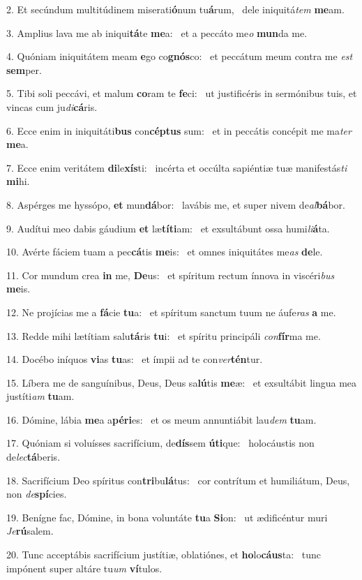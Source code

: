 2. Et secúndum multitúdinem miserati\textbf{ó}num tu\textbf{á}rum, \ast\  dele iniquitá\textit{tem} \textbf{me}am.\

3. Amplius lava me ab iniqui\textbf{tá}te \textbf{me}a: \ast\  et a peccáto me\textit{o} \textbf{mun}da me.\

4. Quóniam iniquitátem meam \textbf{e}go co\textbf{gnós}co: \ast\  et peccátum meum contra me \textit{est} \textbf{sem}per.\

5. Tibi soli peccávi, et malum \textbf{co}ram te \textbf{fe}ci: \ast\  ut justificéris in sermónibus tuis, et vincas cum ju\textit{di}\textbf{cá}ris.\

6. Ecce enim in iniquitáti\textbf{bus} con\textbf{cép}\textbf{tus} sum: \ast\  et in peccátis concépit me ma\textit{ter} \textbf{me}a.\

7. Ecce enim veritátem \textbf{di}le\textbf{xís}ti: \ast\  incérta et occúlta sapiéntiæ tuæ manifestás\textit{ti} \textbf{mi}hi.\

8. Aspérges me hyssópo, \textbf{et} mun\textbf{dá}bor: \ast\  lavábis me, et super nivem de\textit{al}\textbf{bá}bor.\

9. Audítui meo dabis gáudium \textbf{et} læ\textbf{tí}\textbf{ti}am: \ast\  et exsultábunt ossa humi\textit{li}\textbf{á}ta.\

10. Avérte fáciem tuam a pec\textbf{cá}tis \textbf{me}is: \ast\  et omnes iniquitátes me\textit{as} \textbf{de}le.\

11. Cor mundum crea \textbf{in} me, \textbf{De}us: \ast\  et spíritum rectum ínnova in viscéri\textit{bus} \textbf{me}is.\

12. Ne projícias me a \textbf{fá}cie \textbf{tu}a: \ast\  et spíritum sanctum tuum ne áufe\textit{ras} \textbf{a} me.\

13. Redde mihi lætítiam salu\textbf{tá}ris \textbf{tu}i: \ast\  et spíritu principáli \textit{con}\textbf{fír}ma me.\

14. Docébo iníquos \textbf{vi}as \textbf{tu}as: \ast\  et ímpii ad te con\textit{ver}\textbf{tén}tur.\

15. Líbera me de sanguínibus, Deus, Deus sa\textbf{lú}tis \textbf{me}æ: \ast\  et exsultábit lingua mea justíti\textit{am} \textbf{tu}am.\

16. Dómine, lábia \textbf{me}a a\textbf{pé}\textbf{ri}es: \ast\  et os meum annuntiábit lau\textit{dem} \textbf{tu}am.\

17. Quóniam si voluísses sacrifícium, de\textbf{dís}sem \textbf{ú}\textbf{ti}que: \ast\  holocáustis non de\textit{lec}\textbf{tá}beris.\

18. Sacrifícium Deo spíritus con\textbf{tri}bu\textbf{lá}tus: \ast\  cor contrítum et humiliátum, Deus, non \textit{de}\textbf{spí}cies.\

19. Benígne fac, Dómine, in bona voluntáte \textbf{tu}a \textbf{Si}on: \ast\  ut ædificéntur muri \textit{Je}\textbf{rú}salem.\

20. Tunc acceptábis sacrifícium justítiæ, oblatiónes, et \textbf{ho}lo\textbf{cáus}ta: \ast\  tunc impónent super altáre tu\textit{um} \textbf{ví}tulos.\

